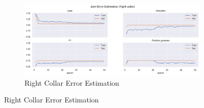 \begin{figure}[!htbp]
\begin{subfigure}[b]{0.47\linewidth}
        \label{fig:v2_leco_jt_ee}
    \end{subfigure}
    \hfill
    \begin{subfigure}[b]{0.47\linewidth}
        \centering
        \includegraphics[width=\textwidth]{figures/Results/v2/jt/Right collar_ErrorEstimation.png}
        \caption{Right Collar Error Estimation}
        \label{fig:v2_rico_jt_ee}
    \end{subfigure}
  \end{figure}
  
